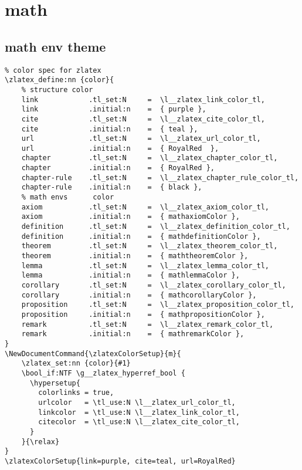 \section{math}
\subsection{math env theme}
\begin{verbatim}
% color spec for zlatex
\zlatex_define:nn {color}{
    % structure color
    link            .tl_set:N     =  \l__zlatex_link_color_tl,
    link            .initial:n    =  { purple },
    cite            .tl_set:N     =  \l__zlatex_cite_color_tl,
    cite            .initial:n    =  { teal },
    url             .tl_set:N     =  \l__zlatex_url_color_tl,
    url             .initial:n    =  { RoyalRed  },
    chapter         .tl_set:N     =  \l__zlatex_chapter_color_tl,
    chapter         .initial:n    =  { RoyalRed },  
    chapter-rule    .tl_set:N     =  \l__zlatex_chapter_rule_color_tl,
    chapter-rule    .initial:n    =  { black },
    % math envs      color
    axiom           .tl_set:N     =  \l__zlatex_axiom_color_tl,
    axiom           .initial:n    =  { mathaxiomColor },
    definition      .tl_set:N     =  \l__zlatex_definition_color_tl,
    definition      .initial:n    =  { mathdefinitionColor },
    theorem         .tl_set:N     =  \l__zlatex_theorem_color_tl,
    theorem         .initial:n    =  { maththeoremColor },
    lemma           .tl_set:N     =  \l__zlatex_lemma_color_tl,
    lemma           .initial:n    =  { mathlemmaColor },
    corollary       .tl_set:N     =  \l__zlatex_corollary_color_tl,
    corollary       .initial:n    =  { mathcorollaryColor },
    proposition     .tl_set:N     =  \l__zlatex_proposition_color_tl,
    proposition     .initial:n    =  { mathpropositionColor },
    remark          .tl_set:N     =  \l__zlatex_remark_color_tl,
    remark          .initial:n    =  { mathremarkColor },
}
\NewDocumentCommand{\zlatexColorSetup}{m}{
    \zlatex_set:nn {color}{#1}
    \bool_if:NTF \g__zlatex_hyperref_bool {
      \hypersetup{
        colorlinks = true,
        urlcolor   = \tl_use:N \l__zlatex_url_color_tl,
        linkcolor  = \tl_use:N \l__zlatex_link_color_tl,
        citecolor  = \tl_use:N \l__zlatex_cite_color_tl,
      }
    }{\relax}
}
\zlatexColorSetup{link=purple, cite=teal, url=RoyalRed}
\end{verbatim}

